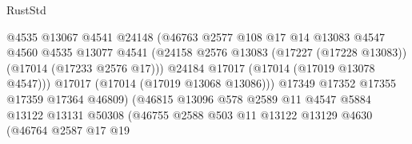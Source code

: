 \begin{lexlean}{RustStd}
\begin{coremodule}
{\begin{coremodule}
{{{{{{{{{{{{{{{{{{{{{{{{{{{{{{{{{{{{{{{{{{{{{{{{{{{{{{{                                          @4535
                                          @13067
                                          @4541
                                          @24148
                                          (@46763
                                            @2577
                                            @108
                                            @17
                                            @14
                                            @13083
                                            @4547
                                            @4560
                                            @4535
                                            @13077
                                            @4541
                                            (@24158
                                              @2576
                                              @13083
                                              (@17227 (@17228 @13083))
                                              (@17014 (@17233 @2576 @17)))
                                            @24184
                                            @17017
                                            (@17014 (@17019 @13078 @4547)))
                                          @17017
                                          (@17014 (@17019 @13068 @13086)))
                                        @17349
                                        @17352
                                        @17355
                                        @17359
                                        @17364
                                        @46809)
                                      (@46815
                                        @13096
                                        @578
                                        @2589
                                        @11
                                        @4547
                                        @5884
                                        @13122
                                        @13131
                                        @50308
                                        (@46755
                                          @2588
                                          @503
                                          @11
                                          @13122
                                          @13129
                                          @4630
                                          (@46764
                                            @2587
                                            @17
                                            @19
}}}}}}}}}}}}}}}}}}}}}}}}}}}}}}}}}}}}}}}}}}}}}}}}}}}}}}}
\end{coremodule}}
\end{coremodule}
\end{lexlean}
